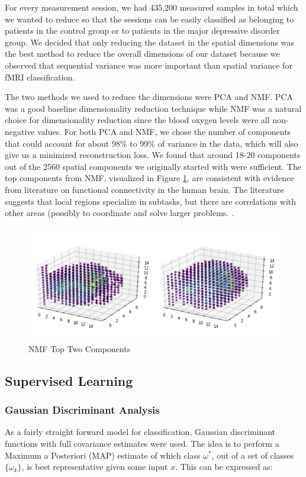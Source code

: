\documentclass{article}[12pt]
\begin{document}
   For every measurement session, we had 435,200 measured samples in total which we wanted to reduce so that the sessions can be easily classified as belonging to patients in the control group or to patients in the major depressive disorder group. We decided that only reducing the dataset in the spatial dimensions was the best method to reduce the overall dimensions of our dataset because we observed that sequential variance was more important than spatial variance for fMRI classification. 
   
   The two methods we used to reduce the dimensions were PCA and NMF. PCA was a good baseline dimensionality reduction technique while NMF was a natural choice for dimensionality reduction since the blood oxygen levels were all non-negative values. For both PCA and NMF, we chose the number of components that could account for about 98\% to 99\% of variance in the data, which will also give us a minimized reconstruction loss. We found that around 18-20 components out of the 2560 spatial components we originally started with were sufficient.   The top components from NMF, visualized in Figure \ref{fig:nmf}, are consistent with evidence from literature on functional connectivity in the human brain.  The literature suggests that local regions specialize in subtasks, but there are correlations with other areas (possibly to coordinate and solve larger problems. \cite{shine2016temporal}.
   
   \begin{figure}[!htb]
   	\centering
   	\includegraphics[width=5in]{nmf_combined_top2}
   	\caption{NMF Top Two Components}
   	\label{fig:nmf}
   \end{figure}

   \subsection{Supervised Learning}
   \subsubsection{Gaussian Discriminant Analysis}
   As a fairly straight forward model for classification, Gaussian discriminant functions with full covariance estimates were used. The idea is to perform a Maximum a Posteriori (MAP) estimate of which class $\omega^*$, out of a set of classes $\lbrace \omega_k \rbrace$, is best representative given some input $x$. This can be expressed as:
   
\end{document}
